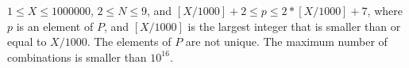 $1 \le X \le 1000000$, $2\le N \le 9$, and $[X/1000]+2 \le p \le 2*[X/1000]+7$, 
where $p$ is an element of $P$, and $[X/1000]$ is the largest integer 
that is smaller than or equal to $X/1000$. 
The elements of $P$ are not unique. 
The maximum number of combinations is smaller than $10^{16}$.
